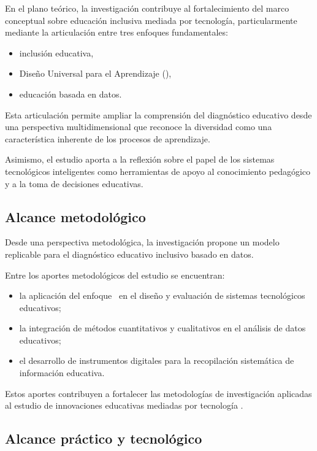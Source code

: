 \begin{refsection}
En el plano teórico, la investigación contribuye al fortalecimiento del marco conceptual sobre educación inclusiva mediada por tecnología, particularmente mediante la articulación entre tres enfoques fundamentales:

\begin{itemize}
\item inclusión educativa,
\item Diseño Universal para el Aprendizaje (\DUA),
\item educación basada en datos.
\end{itemize}

Esta articulación permite ampliar la comprensión del diagnóstico educativo desde una perspectiva multidimensional que reconoce la diversidad como una característica inherente de los procesos de aprendizaje.

Asimismo, el estudio aporta a la reflexión sobre el papel de los sistemas tecnológicos inteligentes como herramientas de apoyo al conocimiento pedagógico y a la toma de decisiones educativas.

\subsection{Alcance metodológico}

Desde una perspectiva metodológica, la investigación propone un modelo replicable para el diagnóstico educativo inclusivo basado en datos.

Entre los aportes metodológicos del estudio se encuentran:

\begin{itemize}
\item la aplicación del enfoque \DBR\ en el diseño y evaluación de sistemas tecnológicos educativos;
\item la integración de métodos cuantitativos y cualitativos en el análisis de datos educativos;
\item el desarrollo de instrumentos digitales para la recopilación sistemática de información educativa.
\end{itemize}

Estos aportes contribuyen a fortalecer las metodologías de investigación aplicadas al estudio de innovaciones educativas mediadas por tecnología \parencite{creswell2014,wang2005}.

\subsection{Alcance práctico y tecnológico}


\end{refsection}

